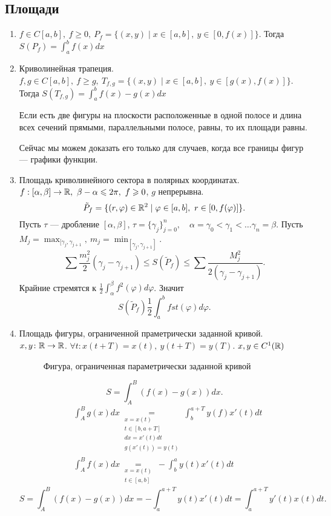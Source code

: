     \subsection{Площади}
    \begin{enumerate}
	\item $ f \in C[a, b], ~ f \ge 0, ~ P_f = \{(x, y) \mid x \in  [a, b], ~ y \in  [0, f(x)]\}$. Тогда $S(P_{f}) = \int_{a}^{b} f(x) dx $
	\item Криволинейная трапеция. $ f, g \in  C[a, b], ~ f \ge g, ~ T _{f, g} = \{ (x, y) \mid x \in [a, b] ,~ y \in  [g(x), f(x)] \}$.
	    Тогда $ S(T_{f, g}) = \int_{a}^{b} f(x) -g(x) dx $
	    \begin{cor}
		Если есть две фигуры на плоскости расположенные в одной полосе и длина всех сечений прямыми, параллельными полосе, равны, то их площади равны.

		Сейчас мы можем доказать его только для случаев, когда все границы фигур --- графики функции.
	    \end{cor}
	\item Площадь криволинейного сектора в полярных координатах.
	    $ f : [ \alpha  , \beta ] \to  \mathbb{R}, ~ \beta  - \alpha \leqslant  2 \pi, ~ f \geqslant 0$, $ g$ непрерывна.
	    \[
		\tilde P_f = \{ (r, \varphi ) \in  \mathbb{R}^2 \mid \varphi  \in  [a, b], ~ r \in  [0, f( \varphi )]\}
	    .\]
	    Пусть $ \tau$ --- дробление $ [ \alpha , \beta ]$, $ \tau  = \{ \gamma_j \}^{n}_{j = 0}, \quad \alpha = \gamma_0 < \gamma_1 < \ldots \gamma_n  = \beta $.
	    Пусть $ M _j= \max_{[\gamma_j, \gamma_{j+1}}, ~ m_j = \min_{[\gamma _j, \gamma_{j+1}]}$.
	    \[
		\sum \frac{m^2_j}{2}(\gamma _j - \gamma_{j+1}) \le  S(\tilde P_f) \le \sum \frac{M_j^2}{2 (\gamma _j - \gamma_{j+1})}
	    .\]
	    Крайние стремятся к $ \frac{1}{2} \int_{ \alpha }^{ \beta } f^2( \varphi )  d \varphi $.
	    Значит
	    \[
		S(\tilde P_f) \frac{1}{2} \int_{ a}^{b} fst( \varphi ) d \varphi
	    .\]
	\item Площадь фигуры, ограниченной праметрически заданной кривой.
	    $ x, y \colon   \mathbb{R} \to \mathbb{R}$. $ \forall  t\colon  x(t + T) = x(t),~ y(t + T) = y(T)$. $ x, y \in  C^{1}(\mathbb{R})$
	    \begin{figure}[ht]
		\centering
		\caption{Фигура, ограниченная параметрически заданной кривой}
		\label{fig:param}
	    \end{figure}
	    \[
		S = \int_{A}^{B}  (f(x) - g(x) ) dx
	    .\]
	    \begin{align*}
    &\int_{A}^{B}  g(x) dx \underset{\substack{x= x(t)\\ t \in [b, a+ T]\\ dx = x'(t) dt \\ g(x'(t)) = y(t)}}{=} \int_{b}^{a + T} y(f) x'(t) dt \\
    & \int_{A}^{B}  f(x) dx \underset{\substack{x=x(t)\\ t \in [a, b]}}{=} -\int_{b}^{a} y(t)  x'(t) dt
	    \end{align*}
	    \[
		S = \int_{A}^{B}  (f(x) - g(x) ) dx  = - \int_{a}^{ a+T} y(t) x'(t) dt  = \int_{a}^{ a+T}  y'(t) x(t) dt
	    .\]
    \end{enumerate}
